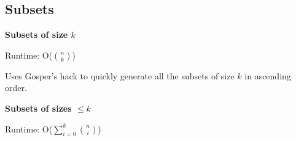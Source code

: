 \subsection*{Subsets}

\textbf{Subsets of size $k$}

Runtime: O($\binom{n}{k}$)

Uses Gosper's hack to quickly generate all the subsets of size $k$ in ascending order.



\textbf{Subsets of sizes $\leq k$}

Runtime: O($\sum_{i=0}^k \binom{n}{i}$)




\newpage